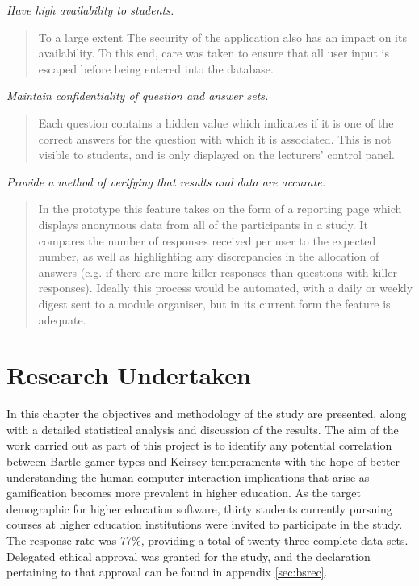\documentclass[12pt,a4paper,twoside]{report}
\begin{document}
\textit{Have high availability to students.}
\begin{quote}
To a large extent  The security of the application also has an impact on its availability. To this end, care was taken to ensure that all user input is escaped before being entered into the database.
\end{quote}
\textit{Maintain confidentiality of question and answer sets.}
\begin{quote}
Each question contains a hidden value which indicates if it is one of the correct answers for the question with which it is associated. This is not visible to students, and is only displayed on the lecturers' control panel.
\end{quote}
\textit{Provide a method of verifying that results and data are accurate.}
\begin{quote}
	In the prototype this feature takes on the form of a reporting page which displays anonymous data from all of the participants in a study. It compares the number of responses received per user to the expected number, as well as highlighting any discrepancies in the allocation of answers (e.g. if there are more killer responses than questions with killer responses). Ideally this process would be automated, with a daily or weekly digest sent to a module organiser, but in its current form the feature is adequate.
\end{quote}

\chapter{Research Undertaken}
\label{sec:research}
In this chapter the objectives and methodology of the study are presented, along with a detailed statistical analysis and discussion of the results. The aim of the work carried out as part of this project is to identify any potential correlation between Bartle gamer types and Keirsey temperaments with the hope of better understanding the human computer interaction implications that arise as gamification becomes more prevalent in higher education. As the target demographic for higher education software, thirty students currently pursuing courses at higher education institutions were invited to participate in the study. The response rate was 77\%, providing a total of twenty three complete data sets. Delegated ethical approval was granted for the study, and the declaration pertaining to that approval can be found in appendix \ref{sec:bsrec}.
\end{document}

